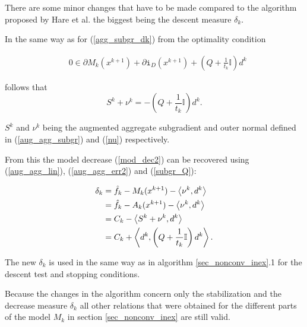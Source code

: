 There are some minor changes that have to be made compared to the algorithm proposed by Hare et al. the biggest being the descent measure \(\delta_k\).

In the same way as for (\ref{agg_subgr_dk}) from the optimality condition

\begin{align*}
	& 0 \in \partial M_k(x^{k+1})+\partial\mathtt{i}_{D}(x^{k+1})+\left(Q+\frac{1}{t_k}\mathbb{I}\right)d^k
	\label{Noll_opt_cond}
\end{align*}

follows that 
\begin{equation}
	S^k+\nu^k = -\left(Q+\frac{1}{t_k}\mathbb{I}\right)d^k.
	\label{subgr_Q}
\end{equation}

\(S^k\) and \(\nu^k\) being the augmented aggregate subgradient and outer normal defined in (\ref{aug_agg_subgr}) and (\ref{nu}) respectively.

From this the model decrease (\ref{mod_dec2}) can be recovered using (\ref{aug_agg_lin}), (\ref{aug_agg_err2}) and (\ref{subgr_Q}):

\begin{equation*}
\begin{split}
	\delta_k  &= \hat{f}_k - M_k(x^{k+1}) - \left\langle\nu^k,d^k\right\rangle\\
	&= \hat{f}_k - A_k(x^{k+1}) - \left\langle\nu^k,d^k\right\rangle\\
	&= C_k - \left\langle S^k+\nu^k,d^k\right\rangle \\
	&= C_k + \left\langle d^k,\left(Q+\frac{1}{t_k}\mathbb{I}\right)d^k\right\rangle.
	\label{Noll_delta}
\end{split}
\end{equation*}

The new \(\delta_k\) is used in the same way as in algorithm \ref{sec_nonconv_inex}.1 for the descent test and stopping conditions.

Because the changes in the algorithm concern only the stabilization and the decrease measure \(\delta_k\) all other relations that were obtained for the different parts of the model \(M_k\) in section \ref{sec_nonconv_inex} are still valid.




